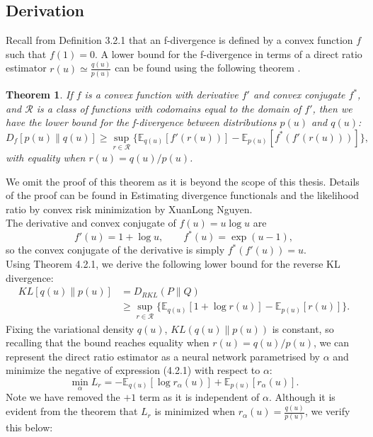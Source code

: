 \documentclass[honours,12pt]{unswthesis}
\newcommand{\E}{\mathbb{E}}
\newtheorem{theorem}{Theorem}[section]
\numberwithin{equation}{section}
\theoremstyle{definition}
\begin{document}
\subsection{Derivation}
Recall from Definition 3.2.1 that an f-divergence is defined by a convex function $f$ such that $f(1)=0$. A lower bound for the f-divergence in terms of a direct ratio estimator $r(u)\simeq \frac{q(u)}{p(u)}$ can be found using the following theorem \citep{nguyen}.
\begin{theorem}
If $f$ is a convex function with derivative $f'$ and convex conjugate $f^*$, and $\mathcal{R}$ is a class of functions with codomains equal to the domain of $f'$, then we have the lower bound for the f-divergence between distributions $p(u)$ and $q(u)$:
\[D_f [p(u)\|q(u)]\geq \sup_{r\in \mathcal{R}} \{\mathbb{E}_{q(u)}[f'(r(u))]-\mathbb{E}_{p(u)}[f^*(f'(r(u)))]\},\]
with equality when $r(u)=q(u)/p(u)$.
\end{theorem}
We omit the proof of this theorem as it is beyond the scope of this thesis. Details of the proof can be found in Estimating divergence functionals and the likelihood ratio by convex risk minimization by XuanLong Nguyen.\\
The derivative and convex conjugate of $f(u)=u\log u$ are
\[f'(u)=1+\log u, \qquad f^*(u)=\exp(u-1),\]
so the convex conjugate of the derivative is simply $f^*(f'(u))=u$.\\
Using Theorem 4.2.1, we derive the following lower bound for the reverse KL divergence:
\begin{align}
KL[q(u)\|p(u)]&=D_{RKL}(P\|Q)\nonumber\\
&\geq \sup_{r\in \mathcal{R}}\{\mathbb{E}_{q(u)}[1+\log r(u)]-\mathbb{E}_{p(u)}[r(u)]\}.
\end{align}
Fixing the variational density $q(u)$, $KL(q(u)\|p(u))$ is constant, so recalling that the bound reaches equality when $r(u)=q(u)/p(u)$, we can represent the direct ratio estimator as a neural network parametrised by $\alpha$ and minimize the negative of expression (4.2.1) with respect to $\alpha$:
\begin{equation}
\min_\alpha L_r=-\E_{q(u)}[\log r_\alpha(u)]+\E_{p(u)}[r_\alpha(u)].
\end{equation}
Note we have removed the $+1$ term as it is independent of $\alpha$. Although it is evident from the theorem that $L_r$ is minimized when $r_\alpha(u)=\frac{q(u)}{p(u)}$, we verify this below:
\end{document}

